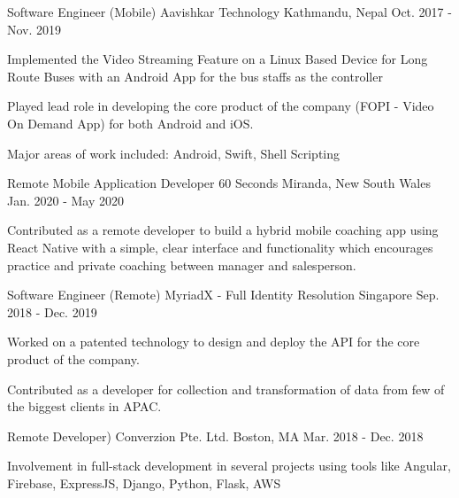 
\begin{cventries}
  \cventry
    {Software Engineer (Mobile)} %
    {Aavishkar Technology} %
    {Kathmandu, Nepal} %
    {Oct. 2017 - Nov. 2019} %
    {
      \begin{cvitems} %
        \item {Implemented the Video Streaming Feature on a Linux Based Device for Long Route Buses with an Android App for the bus staffs as the controller}
        \item {Played lead role in developing the core product of the company (FOPI - Video On Demand App) for both Android and iOS.}
        \item {Major areas of work included: Android, Swift, Shell Scripting}
      \end{cvitems}
    }
    
  \cventry
    {Remote Mobile Application Developer} %
    {60 Seconds} %
    {Miranda, New South Wales} %
    {Jan. 2020 - May 2020} %
    {
      \begin{cvitems} %
        \item {Contributed as a remote developer to build a hybrid mobile coaching app using React Native with a simple, clear interface and functionality which encourages practice and private coaching between manager and salesperson.}
      \end{cvitems}
    }

  \cventry
    {Software Engineer (Remote)} %
    {MyriadX - Full Identity Resolution} %
    {Singapore} %
    {Sep. 2018 - Dec. 2019} %
    {
      \begin{cvitems} %
        \item {Worked on a patented technology to design and deploy the API for the core product of the company.}
        \item {Contributed as a developer for collection and transformation of data from few of the biggest clients in APAC.}
      \end{cvitems}
    }

  \cventry
    {Remote Developer)} %
    {Converzion Pte. Ltd.} %
    {Boston, MA} %
    {Mar. 2018 - Dec. 2018} %
    {
      \begin{cvitems} %
        \item {Involvement in full-stack development in several projects using tools like Angular, Firebase, ExpressJS, Django, Python, Flask, AWS}
      \end{cvitems}
    }


\end{cventries}
